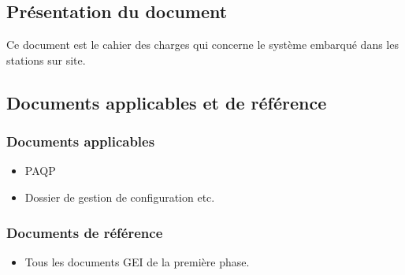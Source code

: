 
    \subsection{Présentation du document}
        Ce document est le cahier des charges qui concerne le système
        embarqué dans les stations sur site.

    \subsection{Documents applicables et de référence}
    
        \subsubsection{Documents applicables}
            \begin{itemize}
               \item PAQP
               \item Dossier de gestion de configuration etc.
            \end{itemize}
        \subsubsection{Documents de référence}
            \begin{itemize}
                \item Tous les documents GEI de la première phase.
            \end{itemize}
\vfil
\pagebreak

